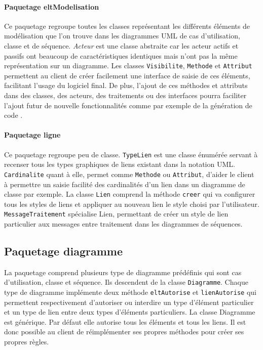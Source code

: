 \documentclass[12pt,a4paper,openany]{report}
\begin{document}
	\paragraph{Paquetage eltModelisation} Ce paquetage regroupe toutes les classes représentant les différents éléments de 
	modélisation que l'on trouve dans les diagrammes UML de cas d'utilisation, classe et de séquence. \textit{Acteur} 
	est une classe abstraite car les acteur actifs et passifs ont beaucoup de caractéristiques identiques mais n'ont pas 
	la même représentation sur un diagramme. Les classes \texttt{Visibilite}, \texttt{Methode} et \texttt{Attribut} permettent au client de créer 
	facilement une interface de saisie de ces éléments, facilitant l'usage du logiciel final. De plus, l'ajout de ces 
	méthodes et attributs dans des classes, des acteurs, des traitements ou des interfaces pourra faciliter l'ajout futur 
	de nouvelle fonctionnalités comme par exemple de la génération de code .
	\paragraph{Paquetage ligne} Ce paquetage regroupe peu de classe. \texttt{TypeLien} est une classe énumérée servant à recenser
	tous les types graphiques de liens existant dans la notation UML. \texttt{Cardinalite} quant à elle, permet comme \texttt{Methode} 
	ou \texttt{Attribut}, d'aider le client à permettre un saisie facilité des cardinalités d'un lien dans un diagramme de classe par exemple.
	La classe \texttt{Lien} comprend la méthode \texttt{creer} qui va configurer tous les styles de liens et appliquer au nouveau lien
	le style choisi par l'utilisateur. \texttt{MessageTraitement} spécialise Lien, permettant de créer un style de lien particulier
	aux messages entre traitement dans les diagrammes de séquences.
	\subsection{Paquetage diagramme}
	La paquetage  comprend plusieurs type de diagramme prédéfinis qui sont cas d'utilisation, classe et séquence.
	Ils descendent de la classe \texttt{Diagramme}. Chaque type de diagramme implémente deux méthode \texttt{eltAutorise} et \texttt{lienAutorise}
	qui permettent respectivement d'autoriser ou interdire un type d'élément particulier et un type de lien entre deux types d'éléments
	particuliers. La classe Diagramme est générique. Par défaut elle autorise tous les éléments et tous les liens. Il est donc possible
	au client de réimplémenter ses propres méthodes pour créer ses propres règles.
\end{document}
